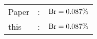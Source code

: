       \begin{tabular}{lcr}
          Paper &:& $\mathrm{Br}  = 0.087\%$ \\
          this      &:& $\mathrm{Br}  = 0.087\%$ \\        
      \end{tabular}
